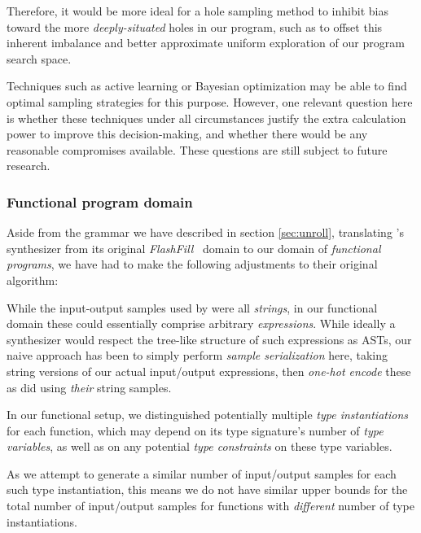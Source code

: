 \documentclass{article}
\begin{document}
Therefore, it would be more ideal for a hole sampling method to inhibit
bias toward the more \emph{deeply-situated} holes in our program,
such as to offset this inherent imbalance and better approximate
uniform exploration of our program search space.

Techniques such as active learning or Bayesian optimization may be able to find optimal sampling strategies for this purpose.
However, one relevant question here is whether these techniques under all circumstances justify the extra calculation power to improve this decision-making,
and whether there would be any reasonable compromises available.
These questions are still subject to future research.


\subsubsection{Functional program domain} \label{sec:fp}

Aside from the grammar we have described in section \ref{sec:unroll},
translating \citet{nsps}'s synthesizer from its original \emph{FlashFill}~\citep{prose} domain to our domain of \emph{functional programs},
we have had to make the following adjustments to their original algorithm:

    While the input-output samples used by \citet{nsps} were all \emph{strings},
    in our functional domain these could essentially comprise arbitrary \emph{expressions}.
    While ideally a synthesizer would respect the tree-like structure of such expressions as ASTs,
    our naive approach has been to simply perform \emph{sample serialization} here,
    taking string versions of our actual input/output expressions,
    then \emph{one-hot encode} these as \citet{nsps} did using \emph{their} string samples.

    In our functional setup,
    we distinguished potentially multiple \emph{type instantiations} for each function,
    which may depend on its type signature's number of \emph{type variables},
    as well as on any potential \emph{type constraints} on these type variables.

    As we attempt to generate a similar number of input/output samples for each such type instantiation,
    this means we do not have similar upper bounds for the total number of input/output samples for functions with \emph{different} number of type instantiations.
\end{document}
